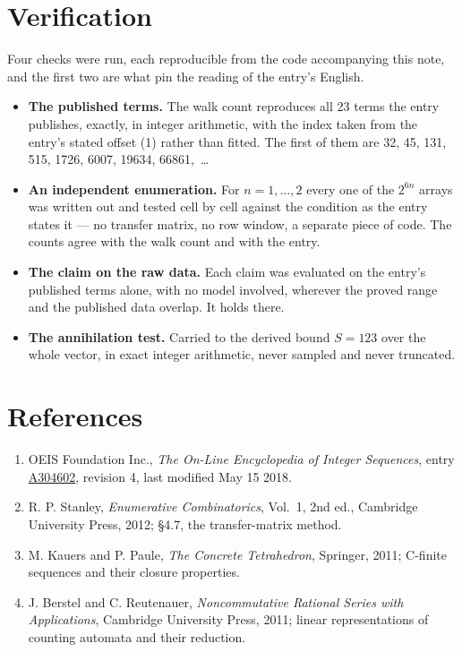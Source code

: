 \documentclass[11pt]{article}
\theoremstyle{definition}
\begin{document}
\section{Verification}

Four checks were run, each reproducible from the code accompanying this note, and the first two are what pin the reading of the entry's English.

\begin{itemize}

\item {\bfseries The published terms.} The walk count reproduces all 23 terms the entry publishes, exactly, in integer arithmetic, with the index taken from the entry's stated offset (1) rather than fitted. The first of them are 32, 45, 131, 515, 1726, 6007, 19634, 66861,~\dots

\item {\bfseries An independent enumeration.} For $n = 1,\dots,2$ every one of the $2^{6n}$ arrays was written out and tested cell by cell against the condition as the entry states it --- no transfer matrix, no row window, a separate piece of code. The counts agree with the walk count and with the entry.

\item {\bfseries The claim on the raw data.} Each claim was evaluated on the entry's published terms alone, with no model involved, wherever the proved range and the published data overlap. It holds there.

\item {\bfseries The annihilation test.} Carried to the derived bound $S = 123$ over the whole vector, in exact integer arithmetic, never sampled and never truncated.

\end{itemize}

\section{References}

\begin{enumerate}

\item OEIS Foundation Inc., \emph{The On-Line Encyclopedia of Integer Sequences}, entry \href{https://oeis.org/A304602}{A304602}, revision 4, last modified May 15 2018.

\item R. P. Stanley, \emph{Enumerative Combinatorics}, Vol.~1, 2nd ed., Cambridge University Press, 2012; \S4.7, the transfer-matrix method.

\item M. Kauers and P. Paule, \emph{The Concrete Tetrahedron}, Springer, 2011; C-finite sequences and their closure properties.

\item J. Berstel and C. Reutenauer, \emph{Noncommutative Rational Series with Applications}, Cambridge University Press, 2011; linear representations of counting automata and their reduction.

\end{enumerate}
\end{document}
